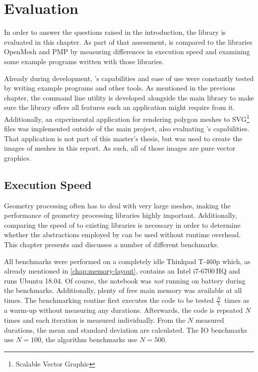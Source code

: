 \chapter{Evaluation}

In order to answer the questions raised in the introduction, the library  is evaluated in this chapter.
As part of that assessment,  is compared to the \cpp libraries OpenMesh and PMP by measuring differences in execution speed and examining some example programs written with those libraries.

Already during development, 's capabilities and ease of use were constantly tested by writing example programs and other tools.
As mentioned in the previous chapter, the command line utility  is developed alongside the main library to make sure the library offers all features such an application might require from it.
Additionally, an experimental application for rendering polygon meshes to SVG\footnote{Scalable Vector Graphic} files was implemented outside of the main project, also evaluating 's capabilities.
That application is not part of this master's thesis, but was used to create the images of meshes in this report.
As such, all of those images are pure vector graphics.


\section{Execution Speed}

Geometry processing often has to deal with very large meshes, making the performance of geometry processing libraries highly important.
Additionally, comparing the speed of  to existing libraries is necessary in order to determine whether the abstractions employed by  can be used without runtime overhead.
This chapter presents and discusses a number of different benchmarks.

All benchmarks were performed on a completely idle \textsf{Thinkpad T-460p} which, as already mentioned in \autoref{chap:memory-layout}, contains an \textsf{Intel i7-6700\,HQ} and runs \textsf{Ubuntu 18.04}.
Of course, the notebook was \emph{not} running on battery during the benchmarks.
Additionally, plenty of free main memory was available at all times.
The benchmarking routine first executes the code to be tested $\frac{N}{5}$~times as a warm-up without measuring any durations.
Afterwards, the code is repeated $N$ times and each iteration is measured individually.
From the $N$ measured durations, the mean and standard deviation are calculated.
The IO benchmarks use $N = 100$, the algorithm benchmarks use $N = 500$.

